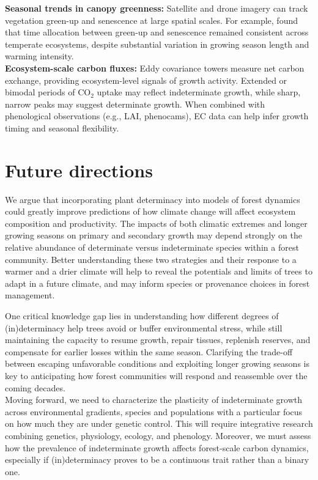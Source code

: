 \documentclass{article}
\begin{document}
\begin{tcolorbox}
			\textbf{Seasonal trends in canopy greenness:} Satellite and drone imagery can track vegetation green-up and senescence at large spatial scales. For example, \citet{mengConsistentTimeAllocation2024} found that time allocation between green-up and senescence remained consistent across temperate ecosystems, despite substantial variation in growing season length and warming intensity.\\
			
			\textbf{Ecosystem-scale carbon fluxes:} Eddy covariance towers measure net carbon exchange, providing ecosystem-level signals of growth activity. Extended or bimodal periods of CO$_2$ uptake may reflect indeterminate growth, while sharp, narrow peaks may suggest determinate growth. When combined with phenological observations (e.g., LAI, phenocams), EC data can help infer growth timing and seasonal flexibility.

	\end{tcolorbox}
	
	
\section*{Future directions}
We argue that incorporating plant determinacy into models of forest dynamics could greatly improve predictions of how climate change will affect ecosystem composition and productivity. The impacts of both climatic extremes and longer growing seasons on primary and secondary growth may depend strongly on the relative abundance of determinate versus indeterminate species within a forest community. Better understanding these two strategies and their response to a warmer and a drier climate will help to reveal the potentials and limits of trees to adapt in a future climate, and may inform species or provenance choices in forest management.

One critical knowledge gap lies in understanding how different degrees of (in)determinacy help trees avoid or buffer environmental stress, while still maintaining the capacity to resume growth, repair tissues, replenish reserves, and compensate for earlier losses within the same season. Clarifying the trade-off between escaping unfavorable conditions and exploiting longer growing seasons is key to anticipating how forest communities will respond and reassemble over the coming decades.\\

Moving forward, we need to characterize the plasticity of indeterminate growth across environmental gradients, species and populations with a particular focus on how much they are under genetic control. 
This will require integrative research combining genetics, physiology, ecology, and phenology. Moreover, we must assess how the prevalence of indeterminate growth affects forest-scale carbon dynamics, especially if (in)determinacy proves to be a continuous trait rather than a binary one. 
\end{document}
